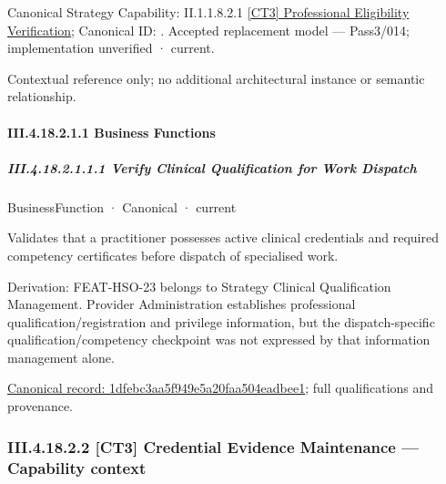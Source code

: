 {\small Canonical Strategy Capability: II.1.1.8.2.1 \hyperref[element:3b43d350a52a4b608bc01eb2530a91be]{[CT3] Professional Eligibility Verification}; Canonical ID: \texttt{}. Accepted replacement model — Pass3/014; implementation unverified · current.}\par
Contextual reference only; no additional architectural instance or semantic relationship.\par
\paragraph*{III.4.18.2.1.1 Business Functions}
\label{navigation:III.4.18.2.1.1}

\subparagraph*{III.4.18.2.1.1.1 Verify Clinical Qualification for Work Dispatch}
\label{navigation:III.4.18.2.1.1.1}

\label{element:1dfebc3aa5f949e5a20faa504eadbee1}
{\small BusinessFunction · Canonical · current}\par

Validates that a practitioner possesses active clinical credentials and required competency certificates before dispatch of specialised work.



Derivation: FEAT-HSO-23 belongs to Strategy Clinical Qualification Management. Provider Administration establishes professional qualification/registration and privilege information, but the dispatch-specific qualification/competency checkpoint was not expressed by that information management alone.


{\footnotesize \href{../../../../continuum/business/business-function/1dfebc3aa5f949e5a20faa504eadbee1.md}{Canonical record: 1dfebc3aa5f949e5a20faa504eadbee1}; full qualifications and provenance.}\par
\subsubsection*{III.4.18.2.2 [CT3] Credential Evidence Maintenance — Capability context}
\label{navigation:III.4.18.2.2}

